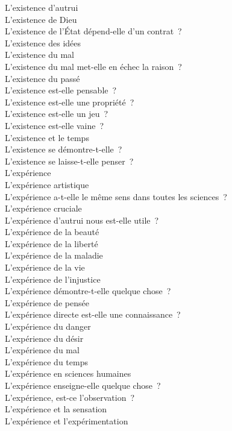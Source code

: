 \documentclass[a4paper,12pt]{article}
\begin{document}
L'existence d'autrui \\
L'existence de Dieu \\
L'existence de l'État dépend-elle d'un contrat ? \\
L'existence des idées \\
L'existence du mal \\
L'existence du mal met-elle en échec la raison ? \\
L'existence du passé \\
L'existence est-elle pensable ? \\
L'existence est-elle une propriété ? \\
L'existence est-elle un jeu ? \\
L'existence est-elle vaine ? \\
L'existence et le temps \\
L'existence se démontre-t-elle ? \\
L'existence se laisse-t-elle penser ? \\
L'expérience \\
L'expérience artistique \\
L'expérience a-t-elle le même sens dans toutes les sciences ? \\
L'expérience cruciale \\
L'expérience d'autrui nous est-elle utile ? \\
L'expérience de la beauté \\
L'expérience de la liberté \\
L'expérience de la maladie \\
L'expérience de la vie \\
L'expérience de l'injustice \\
L'expérience démontre-t-elle quelque chose ? \\
L'expérience de pensée \\
L'expérience directe est-elle une connaissance ? \\
L'expérience du danger \\
L'expérience du désir \\
L'expérience du mal \\
L'expérience du temps \\
L'expérience en sciences humaines \\
L'expérience enseigne-elle quelque chose ? \\
L'expérience, est-ce l'observation ? \\
L'expérience et la sensation \\
L'expérience et l'expérimentation \\
\end{document}
